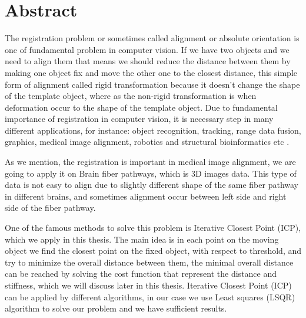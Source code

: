 \documentclass[../structure.tex]{subfiles}
\begin{document}
\chapter{Abstract}
\hspace{2em}The registration problem or sometimes called alignment or absolute orientation is one of fundamental problem in computer vision. If we have two objects and we need to align them that means we should reduce the distance between them by making one object fix and move the other one to the closest distance, this simple form of alignment called rigid transformation because it doesn't change the shape of the template object, where as the non-rigid transformation is when deformation occur to the shape of the template object. Due to fundamental importance of registration in computer vision, it is necessary step in many different applications, for instance: object recognition, tracking, range data fusion, graphics, medical image alignment, robotics and structural bioinformatics etc \cite{Li2007}.

\hspace{2em}As we mention, the registration is important in medical image alignment, we are going to apply it on Brain fiber pathways, which is 3D images data. This type of data is not easy to align due to slightly different shape of the same fiber pathway in different brains, and sometimes alignment occur between left side and right side of the fiber pathway.

\hspace{2em}One of the famous methods to solve this problem is Iterative Closest Point (ICP), which we apply in this thesis. The main idea is in each point on the moving object we find the closest point on the fixed object, with respect to threshold, and try to minimize the overall distance between them, the minimal overall distance can be reached by solving the cost function that represent the distance and stiffness, which we will discuss later in this thesis. Iterative Closest Point (ICP) can be applied by different algorithms, in our case we use Least squares (LSQR) algorithm to solve our problem and we have sufficient results.
\end{document}
